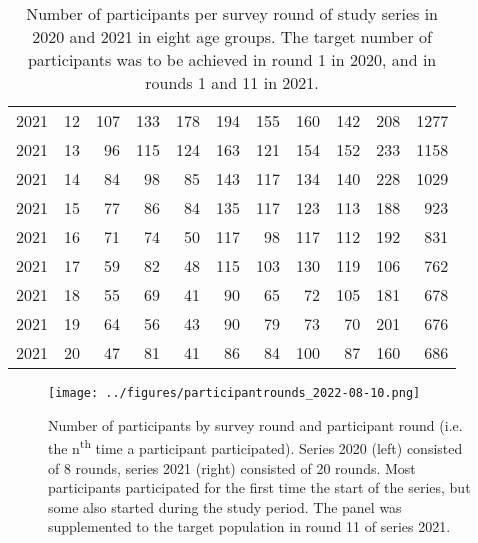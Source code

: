 \documentclass[fleqn,10pt]{wlscirep}
\begin{document}
\begin{table}[ht]
\begin{tabular}{rrrrrrrrrrr}
  2021 &  12 & 107 & 133 & 178 & 194 & 155 & 160 & 142 & 208 & 1277 \\ 
  2021 &  13 &  96 & 115 & 124 & 163 & 121 & 154 & 152 & 233 & 1158 \\ 
  2021 &  14 &  84 &  98 &  85 & 143 & 117 & 134 & 140 & 228 & 1029 \\ 
  2021 &  15 &  77 &  86 &  84 & 135 & 117 & 123 & 113 & 188 & 923 \\ 
  2021 &  16 &  71 &  74 &  50 & 117 &  98 & 117 & 112 & 192 & 831 \\ 
  2021 &  17 &  59 &  82 &  48 & 115 & 103 & 130 & 119 & 106 & 762 \\ 
  2021 &  18 &  55 &  69 &  41 &  90 &  65 &  72 & 105 & 181 & 678 \\ 
  2021 &  19 &  64 &  56 &  43 &  90 &  79 &  73 &  70 & 201 & 676 \\ 
  2021 &  20 &  47 &  81 &  41 &  86 &  84 & 100 &  87 & 160 & 686 \\ 
   \hline
\end{tabular}
\caption{\label{tab:part_round}Number of participants per survey round of study series in 2020 and 2021 in eight age groups. The target number of participants was to be achieved in round 1 in 2020, and in rounds 1 and 11 in 2021.} 
\end{table}

\begin{figure}[ht]
\centering
\texttt{[image: ../figures/participantrounds\_2022-08-10.png]}
\caption{Number of participants by survey round and participant round (i.e. the n\textsuperscript{th} time a participant participated). Series 2020 (left) consisted of 8 rounds, series 2021 (right) consisted of 20 rounds. Most participants participated for the first time the start of the series, but some also started during the study period. The panel was supplemented to the target population in round 11 of series 2021.}
\label{fig:part_round}
\end{figure}
\end{document}
